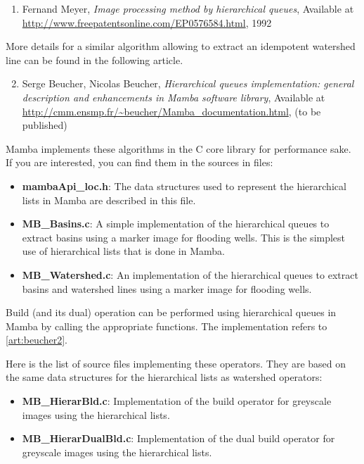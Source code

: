 \documentclass[a4paper,10pt,oneside]{article}
\begin{document}
\begin{enumerate}
\setcounter{enumi}{0}
\item \label{art:meyer} Fernand Meyer,
\emph{Image processing method by hierarchical queues},
Available at \url{http://www.freepatentsonline.com/EP0576584.html}, 1992
\end{enumerate}

More details for a similar algorithm allowing to extract an idempotent 
watershed line can be found in the following article.

\begin{enumerate}
\setcounter{enumi}{1}
\item \label{art:beucher2} Serge Beucher, Nicolas Beucher,
\emph{Hierarchical queues implementation: general description and enhancements
in Mamba software library},
Available at \url{http://cmm.ensmp.fr/\~beucher/Mamba\_documentation.html},
(to be published)
\end{enumerate}

Mamba implements these algorithms in the C core library for performance sake.
If you are interested, you can find them in the sources in files:

\begin{itemize}
\item \textbf{mambaApi\_loc.h}: The data structures used to represent the 
hierarchical lists in Mamba are described in this file.
\item \textbf{MB\_Basins.c}: A simple implementation of the hierarchical queues
to extract basins using a marker image for flooding wells. This is the simplest
use of hierarchical lists that is done in Mamba.
\item \textbf{MB\_Watershed.c}: An implementation of the hierarchical queues to
extract basins and watershed lines using a marker image for flooding wells.
\end{itemize}

Build (and its dual) operation can be performed using hierarchical queues in
Mamba by calling the appropriate functions. The implementation refers to
\ref{art:beucher2}.

Here is the list of source files implementing these operators. They are based on
the same data structures for the hierarchical lists as watershed operators:

\begin{itemize}
\item \textbf{MB\_HierarBld.c}: Implementation of the build operator for
greyscale images using the hierarchical lists.
\item \textbf{MB\_HierarDualBld.c}: Implementation of the dual build operator
for greyscale images using the hierarchical lists.
\end{itemize}
\end{document}
